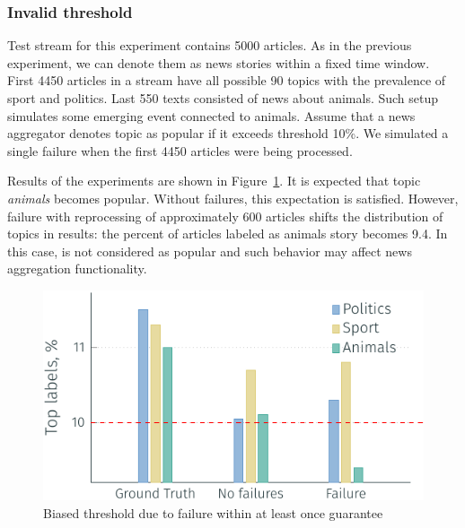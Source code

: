 \subsubsection{Invalid threshold}


Test stream for this experiment contains 5000 articles. As in the previous experiment, we can denote them as news stories within a fixed time window. First 4450 articles in a stream have all possible 90 topics with the prevalence of sport and politics. Last 550 texts consisted of news about animals. Such setup simulates some emerging event connected to animals. Assume that a news aggregator denotes topic as popular if it exceeds threshold 10\%. We simulated a single failure when the first 4450 articles were being processed.

Results of the experiments are shown in Figure~\ref{biased_threshold}. It is expected that topic {\em animals} becomes popular. Without failures, this expectation is satisfied. However, failure with reprocessing of approximately 600 articles shifts the distribution of topics in results: the percent of articles labeled as animals story becomes 9.4. In this case, is not considered as popular and such behavior may affect news aggregation functionality.

\begin{figure}[htbp]
  \centering
  \includegraphics[scale=0.75]{pics/biased_threshold}
  \caption{Biased threshold due to failure within at least once guarantee}
  \label {biased_threshold}
\end{figure}


